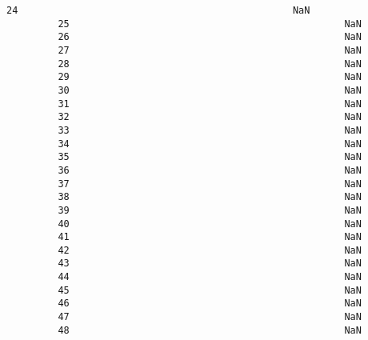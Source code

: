 \documentclass[11pt]{article}
\begin{document}
\begin{Verbatim}[commandchars=\\\{\}]
         24                                                NaN                                   
         25                                                NaN                                   
         26                                                NaN                                   
         27                                                NaN                                   
         28                                                NaN                                   
         29                                                NaN                                   
         30                                                NaN                                   
         31                                                NaN                                   
         32                                                NaN                                   
         33                                                NaN                                   
         34                                                NaN                                   
         35                                                NaN                                   
         36                                                NaN                                   
         37                                                NaN                                   
         38                                                NaN                                   
         39                                                NaN                                   
         40                                                NaN                                   
         41                                                NaN                                   
         42                                                NaN                                   
         43                                                NaN                                   
         44                                                NaN                                   
         45                                                NaN                                   
         46                                                NaN                                   
         47                                                NaN                                   
         48                                                NaN                                   
         

\end{Verbatim}
\end{document}
